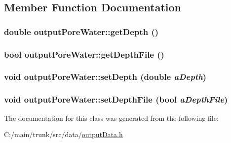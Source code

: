 \subsection{Member Function Documentation}
\hypertarget{classoutput_pore_water_a2e795fa5383bdca42f79ba656ec9c505}{
\subsubsection[{getDepth}]{\setlength{\rightskip}{0pt plus 5cm}double outputPoreWater::getDepth ()}}
\label{classoutput_pore_water_a2e795fa5383bdca42f79ba656ec9c505}
\hypertarget{classoutput_pore_water_a224a940839a8d80815657147fb7d87c1}{
\subsubsection[{getDepthFile}]{\setlength{\rightskip}{0pt plus 5cm}bool outputPoreWater::getDepthFile ()}}
\label{classoutput_pore_water_a224a940839a8d80815657147fb7d87c1}
\hypertarget{classoutput_pore_water_abfd490e51343b58a40e8f4aaf63e21c5}{
\subsubsection[{setDepth}]{\setlength{\rightskip}{0pt plus 5cm}void outputPoreWater::setDepth (double {\em aDepth})}}
\label{classoutput_pore_water_abfd490e51343b58a40e8f4aaf63e21c5}
\hypertarget{classoutput_pore_water_aa87dec5f2c83082703ae65479363b7f4}{
\subsubsection[{setDepthFile}]{\setlength{\rightskip}{0pt plus 5cm}void outputPoreWater::setDepthFile (bool {\em aDepthFile})}}
\label{classoutput_pore_water_aa87dec5f2c83082703ae65479363b7f4}


The documentation for this class was generated from the following file:\begin{DoxyCompactItemize}
\item 
C:/main/trunk/src/data/\hyperlink{output_data_8h}{outputData.h}\end{DoxyCompactItemize}
